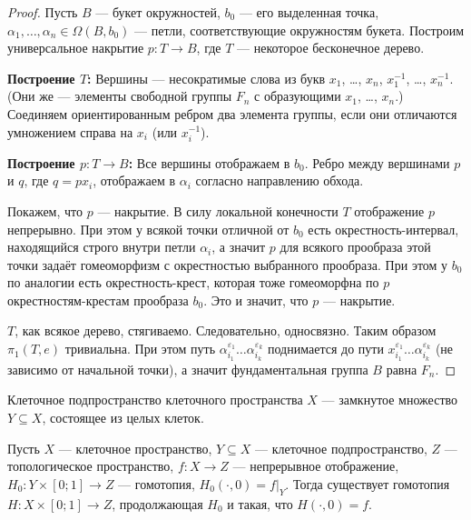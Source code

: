 \documentclass[12pt,a4paper]{article}
\begin{document}
    \begin{proof}
        Пусть $B$ --- букет окружностей, $b_0$ --- его выделенная точка, $\alpha_1, \dots, \alpha_n \in \Omega(B, b_0)$ --- петли, соответствующие окружностям букета. Построим универсальное накрытие $p: T \to B$, где $T$ --- некоторое бесконечное дерево.
        
        \textbf{Построение $T$:} Вершины --- несократимые слова из букв $x_1$, \dots , $x_n$, $x_1^{-1}$, \dots, $x_n^{-1}$. (Они же --- элементы свободной группы $F_n$ с образующими $x_1$, \dots, $x_n$.) Соединяем ориентированным ребром два элемента группы, если они отличаются умножением справа на $x_i$ (или $x_i^{-1}$).
        
        \textbf{Построение $p: T \to B$:} Все вершины отображаем в $b_0$. Ребро между вершинами $p$ и $q$, где $q = px_i$, отображаем в $\alpha_i$ согласно направлению обхода.

        Покажем, что $p$ --- накрытие. В силу локальной конечности $T$ отображение $p$ непрерывно. При этом у всякой точки отличной от $b_0$ есть окрестность-интервал, находящийся строго внутри петли $\alpha_i$, а значит $p$ для всякого прообраза этой точки задаёт гомеоморфизм с окрестностью выбранного прообраза. При этом у $b_0$ по аналогии есть окрестность-крест, которая тоже гомеоморфна по $p$ окрестностям-крестам прообраза $b_0$. Это и значит, что $p$ --- накрытие.

        $T$, как всякое дерево, стягиваемо. Следовательно, односвязно. Таким образом $\pi_1(T, e)$ тривиальна. При этом путь $\alpha_{i_1}^{\varepsilon_1} \dots \alpha_{i_k}^{\varepsilon_k}$ поднимается до пути $x_{i_1}^{\varepsilon_1} \dots \alpha_{i_k}^{\varepsilon_k}$ (не зависимо от начальной точки), а значит фундаментальная группа $B$ равна $F_n$.
    \end{proof}

    \begin{definition}
        Клеточное подпространство клеточного пространства $X$ --- замкнутое множество $Y \subseteq X$, состоящее из целых клеток.
    \end{definition}

    \begin{theorem}
        Пусть $X$ --- клеточное пространство, $Y \subseteq X$ --- клеточное подпространство, $Z$ --- топологическое пространство, $f: X \to Z$ --- непрерывное отображение, $H_0: Y \times [0; 1] \to Z$ --- гомотопия, $H_0({\cdot}, 0) = f|_Y$. Тогда существует гомотопия $H: X \times [0; 1] \to Z$, продолжающая $H_0$ и такая, что $H({\cdot}, 0) = f$.
    \end{theorem}
\end{document}
